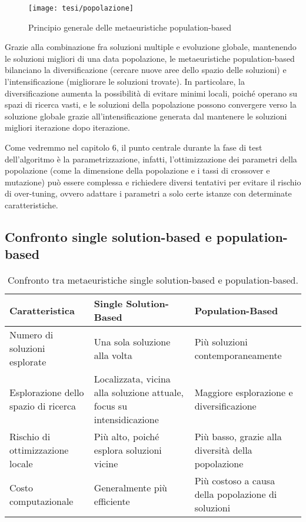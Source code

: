 \begin{figure}[!ht] 
    \centering 
    \texttt{[image: tesi/popolazione]} 
    \caption{Principio generale delle metaeuristiche population-based}
\end{figure}

Grazie alla combinazione fra soluzioni multiple e evoluzione globale, mantenendo le soluzioni migliori di una data popolazione, le metaeuristiche population-based bilanciano la diversificazione (cercare nuove aree dello spazio delle soluzioni) e l'intensificazione (migliorare le soluzioni trovate). In particolare, la diversificazione aumenta la possibilità di evitare minimi locali, poiché operano su spazi di ricerca vasti, e le soluzioni della popolazione possono convergere verso la soluzione globale grazie all'intensificazione generata dal mantenere le soluzioni migliori iterazione dopo iterazione.

Come vedremmo nel capitolo 6, il punto centrale durante la fase di test dell'algoritmo è la parametrizzazione, infatti, l'ottimizzazione dei parametri della popolazione (come la dimensione della popolazione e i tassi di crossover e mutazione) può essere complessa e richiedere diversi tentativi per evitare il rischio di over-tuning, ovvero adattare i parametri a solo certe istanze con determinate caratteristiche.

\subsection{Confronto single solution-based e population-based}

\begin{table}[!ht]
    \centering
    \renewcommand{\arraystretch}{1.7}
    \begin{tabular}{|>{\raggedright\arraybackslash}p{4cm}|>{\raggedright\arraybackslash}p{4cm}|>{\raggedright\arraybackslash}p{4cm}|}
    \hline
    \textbf{Caratteristica} & \textbf{Single Solution-Based} & \textbf{Population-Based} \\ \hline
    Numero di soluzioni esplorate & Una sola soluzione alla volta & Più soluzioni contemporaneamente \\ \hline
    Esplorazione dello spazio di ricerca & Localizzata, vicina alla soluzione attuale, focus su intensidicazione & Maggiore esplorazione e diversificazione \\ \hline
    Rischio di ottimizzazione locale & Più alto, poiché esplora soluzioni vicine & Più basso, grazie alla diversità della popolazione \\ \hline
    Costo computazionale & Generalmente più efficiente & Più costoso a causa della popolazione di soluzioni \\ \hline
    \end{tabular}
    \caption{Confronto tra metaeuristiche single solution-based e population-based.}
    \label{tab:comparison}
\end{table}

